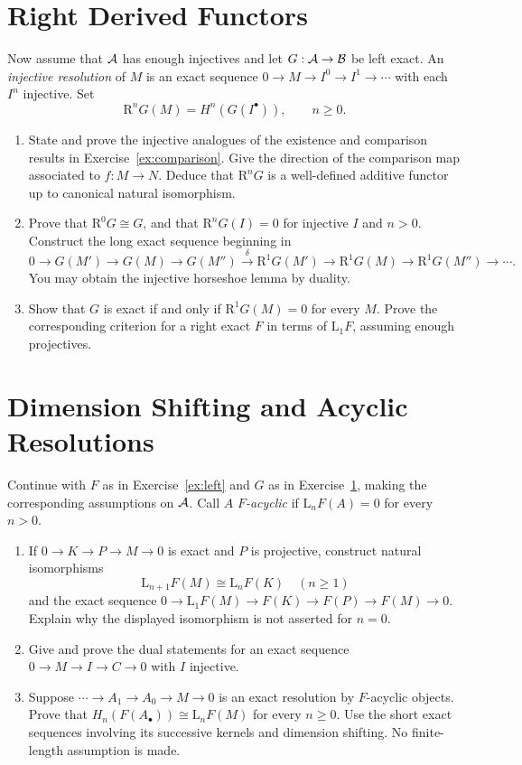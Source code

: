 \documentclass[11pt]{article}
\newcounter{result}[section]
\newcommand{\B}{\mathcal B}
\newcommand{\LF}{\mathrm L}
\newcommand{\RF}{\mathrm R}
\begin{document}
\section{Right Derived Functors}\label{ex:right}
Now assume that $\mathcal A$ has enough injectives and let $G:\A\to\B$ be left exact.
An \emph{injective resolution} of $M$ is an exact sequence
$0\to M\to I^0\to I^1\to\cdots$ with each $I^n$ injective. Set
\[
\RF^nG(M)=H^n(G(I^\bullet)),\qquad n\geq0.
\]
\begin{enumerate}
\item State and prove the injective analogues of the existence and comparison
results in Exercise~\ref{ex:comparison}. Give the direction of the
comparison map associated to $f:M\to N$. Deduce that $\RF^nG$ is a
well-defined additive functor up to canonical natural isomorphism.
\item Prove that $\RF^0G\cong G$, and that $\RF^nG(I)=0$ for injective $I$
and $n>0$. Construct the long exact sequence beginning in
\[
0\to G(M')\to G(M)\to G(M'')\xrightarrow{\delta} \RF^1G(M')
\to\RF^1G(M)\to\RF^1G(M'')\to\cdots.
\]
You may obtain the injective horseshoe lemma by duality.
\item Show that $G$ is exact if and only if $\RF^1G(M)=0$ for every $M$.
Prove the corresponding criterion for a right exact $F$ in terms of
$\LF_1F$, assuming enough projectives.
\end{enumerate}


\section{Dimension Shifting and Acyclic Resolutions}\label{ex:shift}
Continue with $F$ as in Exercise~\ref{ex:left} and $G$ as in
Exercise~\ref{ex:right}, making the corresponding assumptions on $\mathcal A$.
Call $A$ \emph{$F$-acyclic} if $\LF_nF(A)=0$ for every $n>0$.
\begin{enumerate}
\item If $0\to K\to P\to M\to0$ is exact and $P$ is projective, construct
natural isomorphisms
\[
\LF_{n+1}F(M)\cong\LF_nF(K)\quad(n\geq1)
\]
and the exact sequence
$0\to\LF_1F(M)\to F(K)\to F(P)\to F(M)\to0$.
Explain why the displayed isomorphism is not asserted for $n=0$.
\item Give and prove the dual statements for an exact sequence
$0\to M\to I\to C\to0$ with $I$ injective.
\item Suppose $\cdots\to A_1\to A_0\to M\to0$ is an exact resolution
by $F$-acyclic objects. Prove that
$H_n(F(A_\bullet))\cong\LF_nF(M)$ for every $n\geq0$.
Use the short exact sequences involving its successive kernels and
dimension shifting. No finite-length assumption is made.
\end{enumerate}
\end{document}
